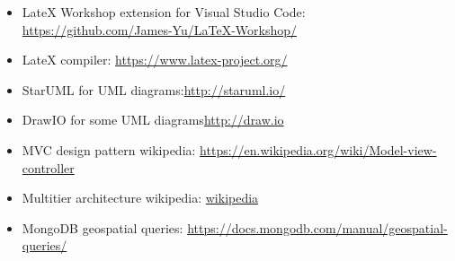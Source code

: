 \begin{itemize}
    \item LateX Workshop extension for Visual Studio Code: \newline\href{https://github.com/James-Yu/LaTeX-Workshop/}{https://github.com/James-Yu/LaTeX-Workshop/}
    \item LateX compiler: \newline\href{https://www.latex-project.org/}{https://www.latex-project.org/}
    \item StarUML for UML diagrams:\newline\href{http://staruml.io/}{http://staruml.io/}
    \item DrawIO for some UML diagrams\newline\href{http://draw.io}{http://draw.io}
    \item MVC design pattern wikipedia: \newline\href{https://en.wikipedia.org/wiki/Model-view-controller}{https://en.wikipedia.org/wiki/Model-view-controller}
    \item Multitier architecture wikipedia: \newline\href{https://en.wikipedia.org/wiki/Multitier_architecture}{wikipedia}
    \item MongoDB geospatial queries: \newline\href{https://docs.mongodb.com/manual/geospatial-queries/}{https://docs.mongodb.com/manual/geospatial-queries/}
\end{itemize}